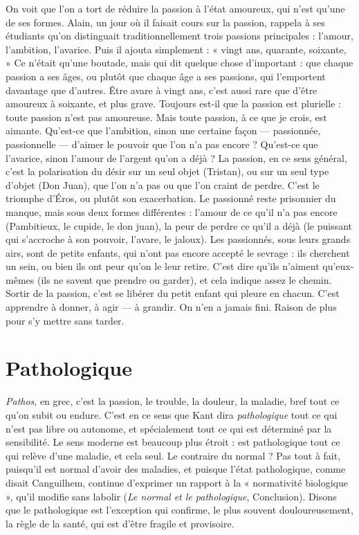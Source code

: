 On voit que l’on a tort de réduire la passion à l’état amoureux, qui n’est
qu’une de ses formes. Alain, un jour où il faisait cours sur la passion, rappela à
ses étudiants qu’on distinguait traditionnellement trois passions principales :
l'amour, l'ambition, l’avarice. Puis il ajouta simplement : « vingt ans, quarante,
soixante, » Ce n’était qu’une boutade, mais qui dit quelque chose d’important :
que chaque passion a ses âges, ou plutôt que chaque âge a ses passions, qui
l’emportent davantage que d’autres. Être avare à vingt ans, c’est aussi rare que
d’être amoureux à soixante, et plus grave. Toujours est-il que la passion est
plurielle : toute passion n’est pas amoureuse. Mais toute passion, à ce que je
crois, est aimante. Qu'est-ce que l’ambition, sinon une certaine façon — passionnée,
passionnelle — d’aimer le pouvoir que l’on n’a pas encore ? Qu'est-ce
que l’avarice, sinon l’amour de l’argent qu’on a déjà ? La passion, en ce sens
général, c’est la polarisation du désir sur un seul objet (Tristan), ou sur un seul
type d’objet (Don Juan), que l’on n’a pas ou que l’on craint de perdre. C’est le
triomphe d’Éros, ou plutôt son exacerbation. Le passionné reste prisonnier du
manque, mais sous deux formes différentes : l'amour de ce qu’il n’a pas encore
(Pambitieux, le cupide, le don juan), la peur de perdre ce qu’il a déjà (le puissant
qui s'accroche à son pouvoir, l’avare, le jaloux). Les passionnés, sous leurs
grands airs, sont de petits enfants, qui n’ont pas encore accepté le sevrage : ils
cherchent un sein, ou bien ils ont peur qu’on le leur retire. C’est dire qu’ils
n'aiment qu’eux-mêmes (ils ne savent que prendre ou garder), et cela indique
assez le chemin. Sortir de la passion, c’est se libérer du petit enfant qui pleure
en chacun. C’est apprendre à donner, à agir — à grandir. On n’en a jamais fini.
Raison de plus pour s’y mettre sans tarder.

\section{Pathologique}
{\it Pathos}, en grec, c’est la passion, le trouble, la douleur, la
maladie, bref tout ce qu’on subit ou endure. C’est en ce
sens que Kant dira {\it pathologique} tout ce qui n’est pas libre ou autonome, et spécialement
tout ce qui est déterminé par la sensibilité. Le sens moderne est beaucoup
plus étroit : est pathologique tout ce qui relève d’une maladie, et cela seul.
Le contraire du normal ? Pas tout à fait, puisqu'il est normal d’avoir des maladies,
et puisque l’état pathologique, comme disait Canguilhem, continue
d'exprimer un rapport à la « normativité biologique », qu’il modifie sans
labolir ({\it Le normal et le pathologique}, Conclusion). Disons que le pathologique
est l’exception qui confirme, le plus souvent douloureusement, la règle de la
santé, qui est d’être fragile et provisoire.

